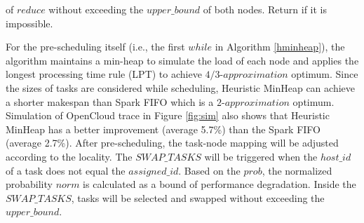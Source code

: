 \begin{minipage}{0.95\columnwidth}
\begin{algorithm}[H]
\begin{algorithmic}[1]
		\State of $reduce$ without exceeding the $upper\_bound$
		\State of both nodes.
		\State Return if it is impossible.
	\EndProcedure
	\end{algorithmic}
\end{algorithm}
\end{minipage}

For the pre-scheduling itself (i.e., the first $while$ in Algorithm \ref{hminheap}), the algorithm maintains a min-heap to simulate the load of each node 
and applies the longest processing time rule (LPT) \cite{design} to achieve $4/3\text{-}approximation$ optimum. 
Since the sizes of tasks are considered while scheduling, Heuristic MinHeap can achieve a shorter makespan than Spark FIFO which is a $2\text{-}approximation$ optimum. 
Simulation of OpenCloud trace in Figure \ref{fig:sim} also shows that Heuristic MinHeap has a better improvement (average 5.7\%) than the Spark FIFO (average 2.7\%).
After pre-scheduling, the task-node mapping will be adjusted according to the locality. 
The $SWAP\_TASKS$ will be triggered when the $host\_id$ of a task does not equal the $assigned\_id$.
Based on the $prob$, the normalized probability $norm$ is calculated as a bound of performance degradation. 
Inside the $SWAP\_TASKS$, tasks will be selected and swapped without exceeding the $upper\_bound$. 

